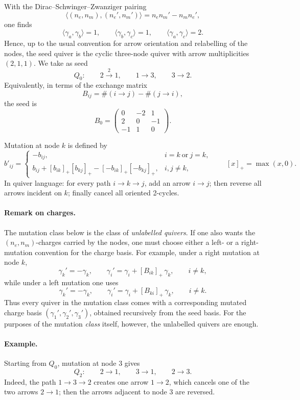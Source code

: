 \documentclass[11pt, a4paper]{article}
\numberwithin{equation}{section}
\begin{document}
With the Dirac--Schwinger--Zwanziger pairing
\[
\langle (n_e,n_m),(n_e',n_m')\rangle
= n_e n_m' - n_m n_e',
\]
one finds
\[
\langle \gamma_a,\gamma_b\rangle =1,\qquad
\langle \gamma_b,\gamma_c\rangle =1,\qquad
\langle \gamma_a,\gamma_c\rangle =2.
\]
Hence, up to the usual convention for arrow orientation and relabelling of the
nodes, the seed quiver is the cyclic three-node quiver with arrow
multiplicities \((2,1,1)\). We take as seed
\[
Q_0:\qquad 2\xrightarrow{2}1,\qquad 1\to3,\qquad 3\to2.
\]
Equivalently, in terms of the exchange matrix
\[
B_{ij}=\#(i\to j)-\#(j\to i),
\]
the seed is
\[
B_0=
\begin{pmatrix}
0&-2&1\\
2&0&-1\\
-1&1&0
\end{pmatrix}.
\]

Mutation at node \(k\) is defined by
\[
b'_{ij}=
\begin{cases}
-b_{ij}, & i=k\ \text{or}\ j=k,\\[4pt]
b_{ij}+[b_{ik}]_+[b_{kj}]_+
      -[-b_{ik}]_+[-b_{kj}]_+, & i,j\neq k,
\end{cases}
\qquad [x]_+=\max(x,0).
\]
In quiver language: for every path \(i\to k\to j\), add an arrow \(i\to j\);
then reverse all arrows incident on \(k\); finally cancel all oriented
2-cycles.

\paragraph{Remark on charges.}
The mutation class below is the class of \emph{unlabelled quivers}. If one also
wants the \((n_e,n_m)\)-charges carried by the nodes, one must choose either a
left- or a right-mutation convention for the charge basis. For example, under a
right mutation at node \(k\),
\[
\gamma_k'=-\gamma_k,\qquad
\gamma_i'=\gamma_i+[B_{ik}]_+\,\gamma_k,\qquad i\neq k,
\]
while under a left mutation one uses
\[
\gamma_k'=-\gamma_k,\qquad
\gamma_i'=\gamma_i+[B_{ki}]_+\,\gamma_k,\qquad i\neq k.
\]
Thus every quiver in the mutation class comes with a corresponding mutated
charge basis \((\gamma_1',\gamma_2',\gamma_3')\), obtained recursively from the
seed basis. For the purposes of the mutation \emph{class} itself, however, the
unlabelled quivers are enough.

\paragraph{Example.}
Starting from \(Q_0\), mutation at node \(3\) gives
\[
Q_2:\qquad 2\to1,\qquad 3\to1,\qquad 2\to3.
\]
Indeed, the path \(1\to3\to2\) creates one arrow \(1\to2\), which cancels one
of the two arrows \(2\to1\); then the arrows adjacent to node \(3\) are
reversed.
\end{document}
